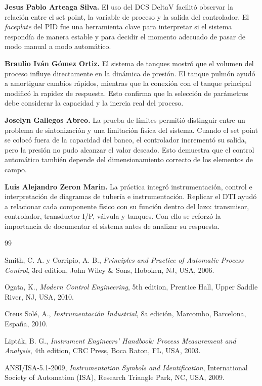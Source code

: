 \documentclass[12pt,letterpaper]{article}
\begin{document}
\textbf{Jesus Pablo Arteaga Silva.} El uso del DCS DeltaV facilitó observar la relación entre el set point, la variable de proceso y la salida del controlador. El \textit{faceplate} del PID fue una herramienta clave para interpretar si el sistema respondía de manera estable y para decidir el momento adecuado de pasar de modo manual a modo automático.

\textbf{Braulio Iván Gómez Ortiz.} El sistema de tanques mostró que el volumen del proceso influye directamente en la dinámica de presión. El tanque pulmón ayudó a amortiguar cambios rápidos, mientras que la conexión con el tanque principal modificó la rapidez de respuesta. Esto confirma que la selección de parámetros debe considerar la capacidad y la inercia real del proceso.

\textbf{Joselyn Gallegos Abreo.} La prueba de límites permitió distinguir entre un problema de sintonización y una limitación física del sistema. Cuando el set point se colocó fuera de la capacidad del banco, el controlador incrementó su salida, pero la presión no pudo alcanzar el valor deseado. Esto demuestra que el control automático también depende del dimensionamiento correcto de los elementos de campo.

\textbf{Luis Alejandro Zeron Marin.} La práctica integró instrumentación, control e interpretación de diagramas de tubería e instrumentación. Replicar el DTI ayudó a relacionar cada componente físico con su función dentro del lazo: transmisor, controlador, transductor I/P, válvula y tanques. Con ello se reforzó la importancia de documentar el sistema antes de analizar su respuesta.

\newpage

\begin{thebibliography}{99}

Smith, C. A. y Corripio, A. B., \textit{Principles and Practice of Automatic Process Control}, 3rd edition, John Wiley \& Sons, Hoboken, NJ, USA, 2006.

Ogata, K., \textit{Modern Control Engineering}, 5th edition, Prentice Hall, Upper Saddle River, NJ, USA, 2010.

Creus Solé, A., \textit{Instrumentación Industrial}, 8a edición, Marcombo, Barcelona, España, 2010.

Lipták, B. G., \textit{Instrument Engineers' Handbook: Process Measurement and Analysis}, 4th edition, CRC Press, Boca Raton, FL, USA, 2003.

ANSI/ISA-5.1-2009, \textit{Instrumentation Symbols and Identification}, International Society of Automation (ISA), Research Triangle Park, NC, USA, 2009.

\end{thebibliography}
\end{document}
